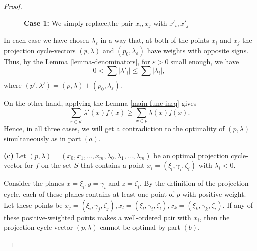 \documentclass[10pt,a4paper]{amsart}
\begin{document}
\begin{proof}
\begin{figure}[ht]
    \caption{\textbf{Case 1:} We simply replace,the pair \(x_i,x_j\) with \(x'_i,x'_j\) }
\end{figure}

    In each case we have chosen \(\lambda_\varepsilon\) in a way that, at both of the points \(x_i\) and \(x_j\) the projection cycle-vectors \((p,\lambda)\) and \((p_0,\lambda_\varepsilon)\) have weights with opposite signs. Thus, by the Lemma \ref{lemma-denominators}, for \(\varepsilon>0\) small enough, we have 
    \[
    0 < \sum_{}|\lambda'_i| \le  \sum|\lambda_i|,
    \]
where \((p',\lambda')=(p,\lambda)+(p_0,\lambda_\varepsilon)\).

On the other hand, applying the Lemma \ref{main-func-ineq} gives
\[
\sum_{x \in p'}\lambda'(x)f(x) \ge \sum_{x \in p}\lambda(x)f(x).
\]
Hence, in all three cases, we will get a contradiction to the optimality of \((p,\lambda)\) simultaneously as in part \((a)\).


\textbf{(c)} Let \((p,\lambda)=(x_0,x_1,...,x_m,\lambda_0,\lambda_1,...,\lambda_m)\) be an optimal projection cycle-vector for \(f\) on the set \(S\) that contains a point \(x_i=(\xi_i,\gamma_i,\zeta_i)\) with \(\lambda_i<0\).

Consider the planes \(x=\xi_i,y=\gamma_i\) and \(z=\zeta_i\). By the definition of the projection cycle, each of these planes contains at least one point of \(p\) with positive weight. Let these points be \(x_j=(\xi_i,\gamma_j,\zeta_j),x_l=(\xi_l,\gamma_i,\zeta_l),x_k=(\xi_k,\gamma_k,\zeta_i)\).
If any of these positive-weighted points makes a well-ordered pair with \(x_i\), then the projection cycle-vector \((p,\lambda)\) cannot be optimal by part \((b)\). 
\begin{figure}[ht]
        \centering
\end{figure}
\end{proof}
\end{document}
